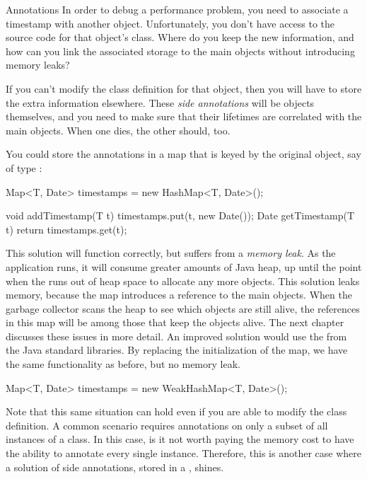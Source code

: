 \begin{example}{Annotations}
In order to debug a performance problem, you need to associate a timestamp with
another object. Unfortunately, you don't have access to the source code for
that object's class. Where do you keep the new information, and how can you
link the associated storage to the main objects without introducing memory
leaks?
\end{example}

If you can't modify the class definition for that object, then you will have to
store the extra information elsewhere. These \emph{side annotations} will be objects themselves, and you need to make sure that their
lifetimes are correlated with the main objects. When one dies, the other
should, too.

You could store the annotations in a map that is keyed by the
original object, say of type :

\begin{shortlisting}
Map<T, Date> timestamps = new HashMap<T, Date>();

void addTimestamp(T t) {
	timestamps.put(t, new Date());
}
Date getTimestamp(T t) {
	return timestamps.get(t);
}
\end{shortlisting}

This solution will function correctly, but suffers from a \emph{memory
leak}. As the application runs, it will consume greater
amounts of Java heap, up until the point when the \jre runs out of heap space to
allocate any more objects. This solution leaks memory, because the
 map introduces a reference to the main objects. When the
garbage collector scans the heap to see which objects are still alive, the
references in this map will be among those that keep the objects alive. The next
chapter discusses these issues in more detail. An improved solution would use the
 from the Java standard libraries. By replacing the
initialization of the  map, we have the same functionality as
before, but no memory leak.

\begin{shortlisting}
Map<T, Date> timestamps = new WeakHashMap<T, Date>();
\end{shortlisting}

Note that this same situation can hold even if you are able to modify the class
definition. A common scenario requires annotations on only a subset of all
instances of a class. In this case, is it not worth paying the memory cost to
have the ability to annotate every single instance. Therefore, this is another
case where a solution of side annotations, stored in a ,
shines.

